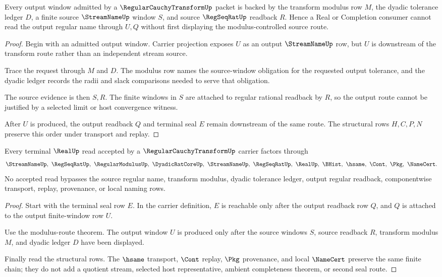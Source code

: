 \begin{theorem}
\label{thm:regular-cauchy-transform-modulus-route}
Every output window admitted by a $\RegularCauchyTransformUp$ packet is backed by the transform modulus row $M$, the dyadic tolerance ledger $D$, a finite source $\StreamNameUp$ window $S$, and source $\RegSeqRatUp$ readback $R$. Hence a Real or Completion consumer cannot read the output regular name through $U,Q$ without first displaying the modulus-controlled source route.
\end{theorem}
\begin{proof}
Begin with an admitted output window. Carrier projection exposes $U$ as an output $\StreamNameUp$ row, but $U$ is downstream of the transform route rather than an independent stream source.

Trace the request through $M$ and $D$. The modulus row names the source-window obligation for the requested output tolerance, and the dyadic ledger records the radii and slack comparisons needed to serve that obligation.

The source evidence is then $S,R$. The finite windows in $S$ are attached to regular rational readback by $R$, so the output route cannot be justified by a selected limit or host convergence witness.

After $U$ is produced, the output readback $Q$ and terminal seal $E$ remain downstream of the same route. The structural rows $H,C,P,N$ preserve this order under transport and replay.
\end{proof}

\begin{theorem}
\label{thm:regular-cauchy-transform-real-seal-nonescape}
Every terminal $\RealUp$ read accepted by a $\RegularCauchyTransformUp$ carrier factors through
$$
\StreamNameUp,\ \RegSeqRatUp,\ \RegularModulusUp,\ \DyadicRatCoreUp,\ \StreamNameUp,\ \RegSeqRatUp,\ \RealUp,\ \BHist,\ \hsame,\ \Cont,\ \Pkg,\ \NameCert .
$$
No accepted read bypasses the source regular name, transform modulus, dyadic tolerance ledger, output regular readback, componentwise transport, replay, provenance, or local naming rows.
\end{theorem}
\begin{proof}
Start with the terminal seal row $E$. In the carrier definition, $E$ is reachable only after the output readback row $Q$, and $Q$ is attached to the output finite-window row $U$.

Use the modulus-route theorem. The output window $U$ is produced only after the source windows $S$, source readback $R$, transform modulus $M$, and dyadic ledger $D$ have been displayed.

Finally read the structural rows. The $\hsame$ transport, $\Cont$ replay, $\Pkg$ provenance, and local $\NameCert$ preserve the same finite chain; they do not add a quotient stream, selected host representative, ambient completeness theorem, or second seal route.
\end{proof}

